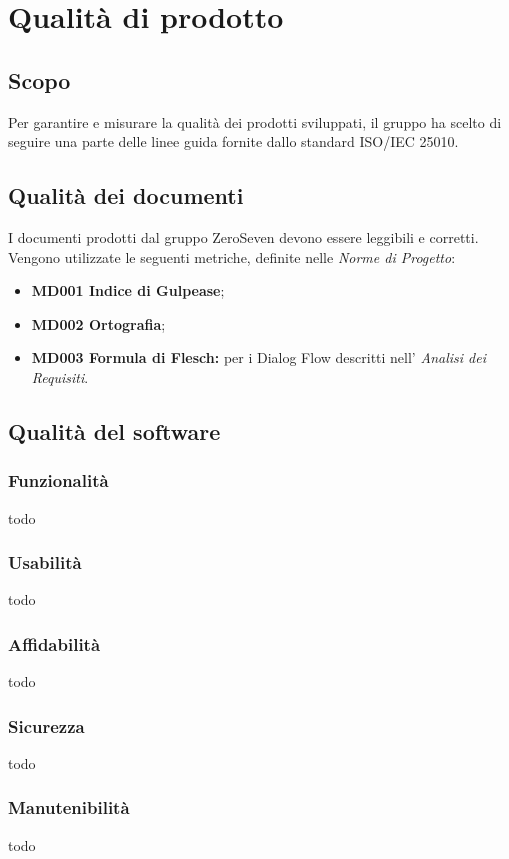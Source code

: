 \chapter{Qualità di prodotto}
\section{Scopo}
Per garantire e misurare la qualità dei prodotti sviluppati, il gruppo ha scelto di seguire una parte delle linee guida fornite dallo standard ISO/IEC 25010.
\section{Qualità dei documenti}
I documenti prodotti dal gruppo ZeroSeven devono essere leggibili e corretti. Vengono utilizzate le seguenti metriche, definite nelle \textit{Norme di Progetto}:
\begin{itemize}
    \item \textbf{MD001 Indice di Gulpease};
    \item \textbf{MD002 Ortografia};
    \item \textbf{MD003 Formula di Flesch:} per i Dialog Flow descritti nell' \textit{Analisi dei Requisiti}.
\end{itemize}
\section{Qualità del software}
\subsection{Funzionalità}
todo
\subsection{Usabilità}
todo
\subsection{Affidabilità}
todo
\subsection{Sicurezza}
todo
\subsection{Manutenibilità}
todo
